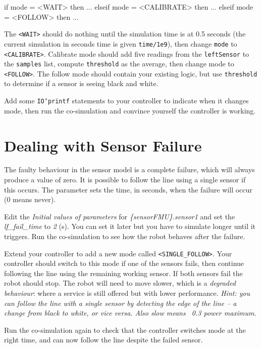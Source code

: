 \documentclass[11pt,a4paper]{../tutorial}
\begin{document}
\begin{instructions}
    \bigskip
    \begin{vdm}[style=styleVDM,basicstyle=\ttfamily\scriptsize,xleftmargin=0em]
	if mode = <WAIT> then ...
	elseif mode = <CALIBRATE> then ...
	elseif mode = <FOLLOW> then ...
    \end{vdm}

    The \texttt{<WAIT>} should do nothing until the simulation time is at 0.5 seconds (the current simulation in seconds time is given \texttt{time/1e9}), then change \texttt{mode} to \texttt{<CALIBRATE>}. Calibrate mode should add five readings from the \texttt{leftSensor} to the \texttt{samples} list, compute \texttt{threshold} as the average, then change mode to \texttt{<FOLLOW>}. The follow mode should contain your existing logic, but use \texttt{threshold} to determine if a sensor is seeing black and white.

\item Add some \texttt{IO`printf} statements to your controller to indicate when it changes mode, then run the co-simulation and convince yourself the controller is working.

\end{instructions}

\section{Dealing with Sensor Failure}

The faulty behaviour in the sensor model is a complete failure, which will always produce a value of zero. It is possible to follow the line using a single sensor if this occurs. The parameter sets the time, in seconds, when the failure will occur (0 means never).

\begin{instructions}
\item  Edit the \emph{Initial values of parameters} for \emph{\{sensorFMU\}.sensor1} and set the \emph{lf\_fail\_time} to \emph{2} (s). You can set it later but you have to simulate longer until it triggers. Run the co-simulation to see how the robot behaves after the failure.

\item Extend your controller to add a new mode called \texttt{<SINGLE\_FOLLOW>}. Your controller should switch to this mode if one of the sensors fails, then continue following the line using the remaining working sensor. If both sensors fail the robot should stop. The robot will need to move slower, which is a \emph{degraded behaviour}: where a service is still offered but with lower performance. \emph{Hint: you can follow the line with a single sensor by detecting the edge of the line -- a change from black to white, or vice versa. Also slow means ~0.3 power maximum}.

\item Run the co-simulation again to check that the controller switches mode at the right time, and can now follow the line despite the failed sensor.

\end{instructions}
\end{document}
